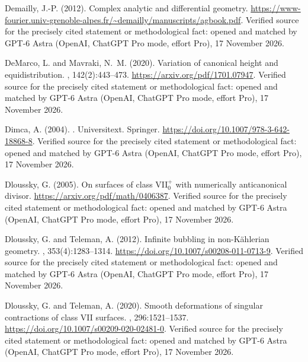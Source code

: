 \begin{thebibliography}{}
Demailly, J.-P. (2012).
\newblock Complex analytic and differential geometry.
\newblock \url{https://www-fourier.univ-grenoble-alpes.fr/~demailly/manuscripts/agbook.pdf}. Verified source for the precisely cited statement or methodological fact: opened and matched by GPT-6 Astra (OpenAI, ChatGPT Pro mode, effort Pro), 17 November 2026.

DeMarco, L. and Mavraki, N.~M. (2020).
\newblock Variation of canonical height and equidistribution.
, 142(2):443--473.
\newblock \url{https://arxiv.org/pdf/1701.07947}. Verified source for the precisely cited statement or methodological fact: opened and matched by GPT-6 Astra (OpenAI, ChatGPT Pro mode, effort Pro), 17 November 2026.

Dimca, A. (2004).
.
\newblock Universitext. Springer.
\newblock \url{https://doi.org/10.1007/978-3-642-18868-8}. Verified source for the precisely cited statement or methodological fact: opened and matched by GPT-6 Astra (OpenAI, ChatGPT Pro mode, effort Pro), 17 November 2026.

Dloussky, G. (2005).
\newblock On surfaces of class {VII}$_0^+$ with numerically anticanonical
  divisor.
\newblock \url{https://arxiv.org/pdf/math/0406387}. Verified source for the precisely cited statement or methodological fact: opened and matched by GPT-6 Astra (OpenAI, ChatGPT Pro mode, effort Pro), 17 November 2026.

Dloussky, G. and Teleman, A. (2012).
\newblock Infinite bubbling in non-{K}{\"a}hlerian geometry.
, 353(4):1283--1314.
\newblock \url{https://doi.org/10.1007/s00208-011-0713-9}. Verified source for the precisely cited statement or methodological fact: opened and matched by GPT-6 Astra (OpenAI, ChatGPT Pro mode, effort Pro), 17 November 2026.

Dloussky, G. and Teleman, A. (2020).
\newblock Smooth deformations of singular contractions of class {VII} surfaces.
, 296:1521--1537.
\newblock \url{https://doi.org/10.1007/s00209-020-02481-0}. Verified source for the precisely cited statement or methodological fact: opened and matched by GPT-6 Astra (OpenAI, ChatGPT Pro mode, effort Pro), 17 November 2026.


\end{thebibliography}
